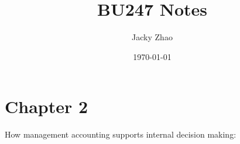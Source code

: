 \documentclass[letterpaper, 12pt]{article}
\begin{document}
    \clearpage
    \vspace*{\fill}
    \begin{center}
        \begin{minipage}{\textwidth} 
            \title{BU247 Notes}
            \author{Jacky Zhao}
            \date{\today}
            \maketitle
        \end{minipage} 
    \end{center}
    \vfill
    \thispagestyle{empty}
    \newpage
    \setcounter{page}{1}
    \pagebreak

    \section{Chapter 2}
    How management accounting supports internal decision making:
\end{document}
